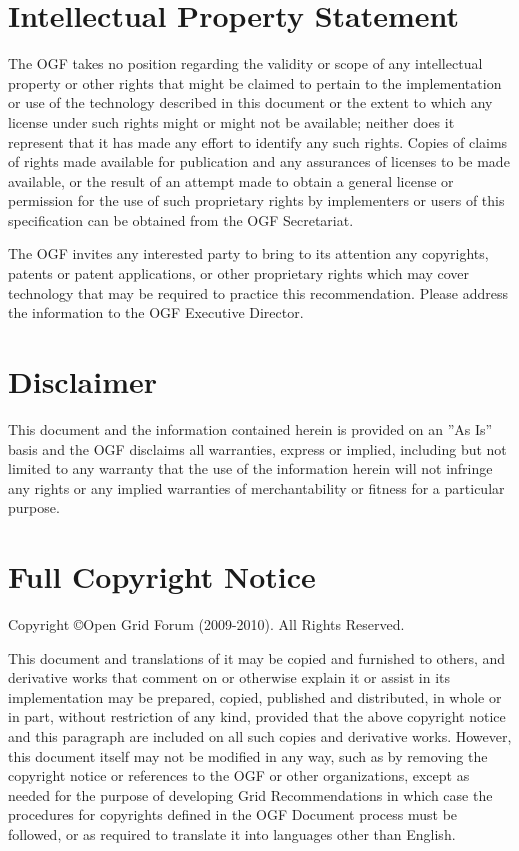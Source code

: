 \documentclass[10pt,a4paper]{article}
\begin{document}
\section{Intellectual Property Statement}
The OGF takes no position regarding the validity or scope of any
intellectual property or other rights that might be claimed to pertain
to the implementation or use of the technology described in this
document or the extent to which any license under such rights might or
might not be available; neither does it represent that it has made any
effort to identify any such rights. Copies of claims of rights made
available for publication and any assurances of licenses to be made
available, or the result of an attempt made to obtain a general
license or permission for the use of such proprietary rights by
implementers or users of this specification can be obtained from the
OGF Secretariat.

The OGF invites any interested party to bring to its attention any
copyrights, patents or patent applications, or other proprietary
rights which may cover technology that may be required to practice
this recommendation. Please address the information to the OGF
Executive Director.

\section{Disclaimer}
This document and the information contained herein is provided on an
''As Is'' basis and the OGF disclaims all warranties, express or
implied, including but not limited to any warranty that the use of the
information herein will not infringe any rights or any implied
warranties of merchantability or fitness for a particular purpose.

\section{Full Copyright Notice}
Copyright \copyright Open Grid Forum (2009-2010). All Rights Reserved.

This document and translations of it may be copied and furnished to
others, and derivative works that comment on or otherwise explain it
or assist in its implementation may be prepared, copied, published and
distributed, in whole or in part, without restriction of any kind,
provided that the above copyright notice and this paragraph are
included on all such copies and derivative works. However, this
document itself may not be modified in any way, such as by removing
the copyright notice or references to the OGF or other organizations,
except as needed for the purpose of developing Grid Recommendations in
which case the procedures for copyrights defined in the OGF Document
process must be followed, or as required to translate it into
languages other than English.
\end{document}

